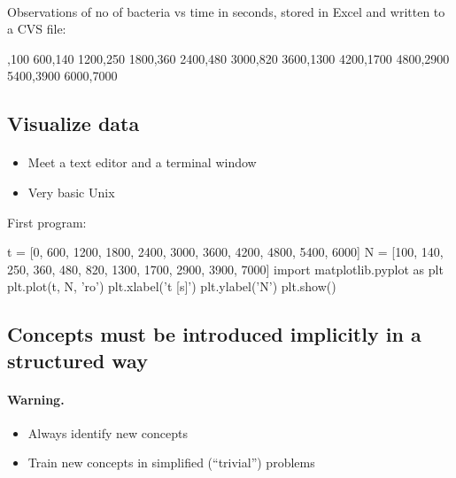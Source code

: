\documentclass[%
twoside,                 %
final,                   %
10pt]{article}
\begin{document}
\paragraph{}
Observations of no of bacteria vs time in seconds,
stored in Excel and written to a CVS file:

,100
600,140
1200,250
1800,360
2400,480
3000,820
3600,1300
4200,1700
4800,2900
5400,3900
6000,7000
\etxt



\subsection{Visualize data}


\paragraph{}
\begin{itemize}
 \item Meet a text editor and a terminal window

 \item Very basic Unix
\end{itemize}

\noindent
First program:

\bpypro
t = [0, 600, 1200, 1800, 2400, 3000, 3600,
     4200, 4800, 5400, 6000]
N = [100, 140, 250, 360, 480, 820, 1300, 1700, 2900, 3900, 7000]
import matplotlib.pyplot as plt
plt.plot(t, N, 'ro')
plt.xlabel('t [s]')
plt.ylabel('N')
plt.show()
\epypro




\subsection{Concepts must be introduced implicitly in a structured way}


\paragraph{Warning.}
\begin{itemize}
 \item Always identify new concepts

 \item Train new concepts in simplified (``trivial'') problems
\end{itemize}
\end{document}
